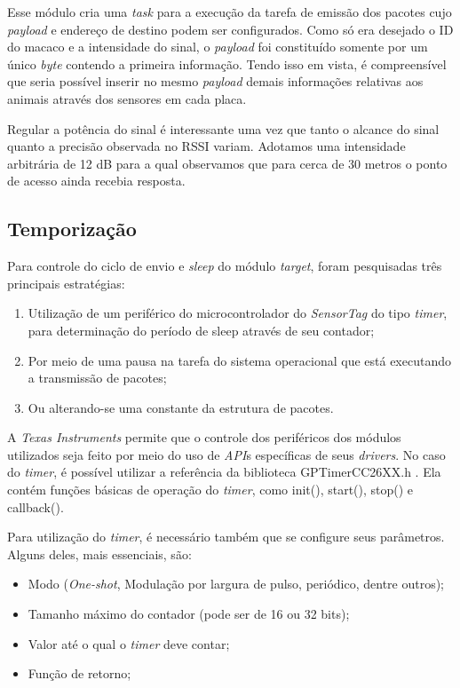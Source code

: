 Esse módulo cria uma \emph{task} para a execução da tarefa de emissão dos pacotes cujo \emph{payload} e endereço de destino podem ser configurados. Como só era desejado o ID do macaco e a intensidade do sinal, o \emph{payload} foi constituído somente por um único \emph{byte} contendo a primeira informação. Tendo isso em vista, é compreensível que seria possível inserir no mesmo \emph{payload} demais informações relativas aos animais através dos sensores em cada placa.

Regular a potência do sinal é interessante uma vez que tanto o alcance do sinal quanto a precisão observada no RSSI variam. Adotamos uma intensidade arbitrária de 12 dB para a qual observamos que para cerca de 30 metros o ponto de acesso ainda recebia resposta.

\subsection{Temporização}

Para controle do ciclo de envio e \emph{sleep} do módulo \emph{target}, foram pesquisadas três principais estratégias:

\begin{enumerate}
  \item Utilização de um periférico do microcontrolador do \emph{SensorTag} do tipo \emph{timer}, para determinação do período de sleep através de seu contador;
  \item Por meio de uma pausa na tarefa do sistema operacional que está executando a transmissão de pacotes;
  \item Ou alterando-se uma constante da estrutura de pacotes.
\end{enumerate}

A \emph{Texas Instruments} permite que o controle dos periféricos dos módulos utilizados seja feito por meio do uso de \emph{API}s específicas de seus \emph{drivers}. No caso do \emph{timer}, é possível utilizar a referência da biblioteca GPTimerCC26XX.h \cite{gptimer}. Ela contém funções básicas de operação do \emph{timer}, como init(), start(), stop() e callback().

Para utilização do \emph{timer}, é necessário também que se configure seus parâmetros. Alguns deles, mais essenciais, são:

\begin{itemize}
	\item Modo (\emph{One-shot}, Modulação por largura de pulso, periódico, dentre outros);
	\item Tamanho máximo do contador (pode ser de 16 ou 32 bits);
	\item Valor até o qual o \emph{timer} deve contar;
	\item Função de retorno;
\end{itemize}

